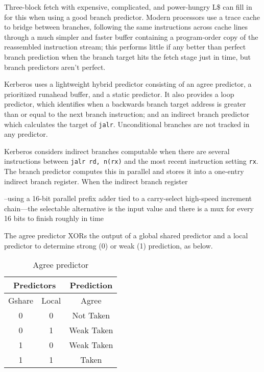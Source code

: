 Three-block fetch with expensive, complicated, and power-hungry L\$ can fill in
for this when using a good branch predictor.  Modern processors use a trace
cache to bridge between branches, following the same instructions across cache
lines through a much simpler and faster buffer containing a program-order copy
of the reassembled instruction stream; this performs little if any better than
perfect branch prediction when the branch target hits the fetch stage just in
time, but branch predictors aren't perfect.

Kerberos uses a lightweight hybrid predictor consisting of an agree predictor,
a prioritized runahead buffer, and a static predictor.  It also provides a loop
predictor, which identifies when a backwards branch target address is greater
than or equal to the next branch instruction; and an indirect branch predictor
which calculates the target of \lstinline!jalr!.  Unconditional branches are
not tracked in any predictor.

Kerberos considers indirect branches computable when there are several
instructions between \lstinline!jalr rd, n(rx)! and the most recent instruction
setting \lstinline!rx!.  The branch predictor computes this in parallel and
stores it into a one-entry indirect branch register.  When the indirect branch
register

--using a 16-bit parallel prefix adder tied to a carry-select high-speed increment chain—the selectable alternative is the input value and there is a mux for every 16 bits to finish roughly in time

The agree predictor XORs the output of a global shared predictor and a local
predictor to determine strong (0) or weak (1) prediction, as below.

\begin{table}[htp]
    \centering
\begin{tabular}{|c|c|c|}
    \hline
    \multicolumn{2}{|c|}{Predictors} & Prediction \\
    \hline
    Gshare & Local & Agree \\
    \hline
    0 & 0 & Not Taken \\
    \hline
    0 & 1 & Weak Taken \\
    \hline
    1 & 0 & Weak Taken \\
    \hline
    1 & 1 & Taken \\
    \hline
\end{tabular}
\caption{Agree predictor}
\label{tab:branch-agree-predictor}
\end{table}

